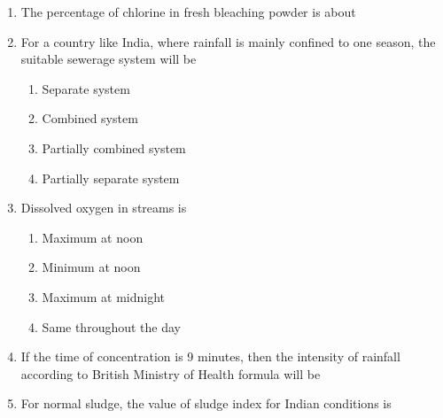 \documentclass[11pt,a4paper]{article}
\begin{document}
\begin{enumerate}
\item{The percentage of chlorine in fresh bleaching powder is about}
\\
\item{For a country like India, where rainfall is mainly confined to one season, the suitable sewerage system will be}
\begin{enumerate}[label=\Alph*.]
\item{Separate system}
\item{Combined system}
\item{Partially combined system}
\item{Partially separate system}
\end{enumerate}
\item{Dissolved oxygen in streams is}
\begin{enumerate}[label=\Alph*.]
\item{Maximum at noon}
\item{Minimum at noon}
\item{Maximum at midnight}
\item{Same throughout the day}
\end{enumerate}
\item{If the time of concentration is 9 minutes, then the intensity of rainfall according to British Ministry of Health formula will be}
\\
\item{For normal sludge, the value of sludge index for Indian conditions is}
\\\begin{enumerate*}[itemjoin=\qquad, label=\Alph*.]

\end{enumerate*}
\end{enumerate}
\end{document}
